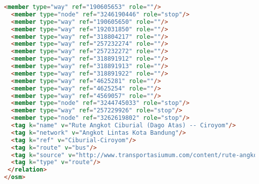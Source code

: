 \begin{lstlisting}[language=HTML,basicstyle=\tiny,caption=test.xml]
  <member type="way" ref="190605653" role=""/>
  <member type="node" ref="3246190446" role="stop"/>
  <member type="way" ref="190605650" role=""/>
  <member type="way" ref="192031850" role=""/>
  <member type="way" ref="318804217" role=""/>
  <member type="way" ref="257232274" role=""/>
  <member type="way" ref="257232272" role=""/>
  <member type="way" ref="318891912" role=""/>
  <member type="way" ref="318891913" role=""/>
  <member type="way" ref="318891922" role=""/>
  <member type="way" ref="4625281" role=""/>
  <member type="way" ref="4625254" role=""/>
  <member type="way" ref="4569057" role=""/>
  <member type="node" ref="3244745033" role="stop"/>
  <member type="way" ref="257229926" role="stop"/>
  <member type="node" ref="3262619802" role="stop"/>
  <tag k="name" v="Rute Angkot Ciburial (Dago Atas) -- Ciroyom"/>
  <tag k="network" v="Angkot Lintas Kota Bandung"/>
  <tag k="ref" v="Ciburial-Ciroyom"/>
  <tag k="route" v="bus"/>
  <tag k="source" v="http://www.transportasiumum.com/content/rute-angkot-bandung"/>
  <tag k="type" v="route"/>
 </relation>
</osm>
\end{lstlisting}